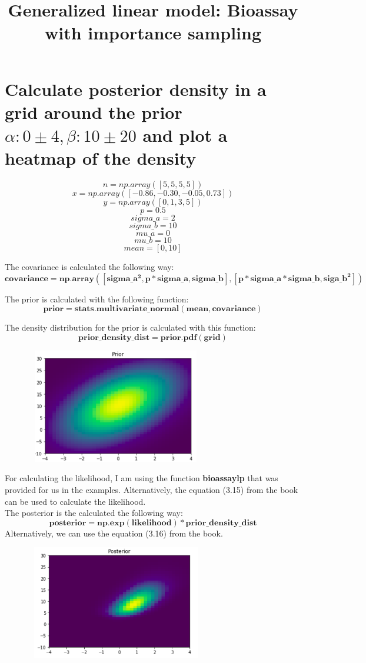 \documentclass[17pt]{article}
\begin{document}
\title{\textbf{Generalized linear model: Bioassay with importance sampling}}
\maketitle

\section{Calculate posterior density in a grid around the prior $ \alpha: 0 \pm 4, \beta: 10 \pm 20 $ and plot a heatmap of the density}

$$ n = np.array([5, 5, 5, 5]) $$
$$ x = np.array([-0.86, -0.30, -0.05, 0.73]) $$
$$ y = np.array([0, 1, 3, 5]) $$
$$ p = 0.5 $$
$$ sigma\_a = 2 $$
$$ sigma\_b = 10 $$
$$ mu\_a = 0 $$
$$ mu\_b = 10 $$
$$ mean = [0, 10] $$

The covariance is calculated the following way:
$$ \mathbf{covariance = np.array([sigma\_a^2, p * sigma\_a, sigma\_b], [p * sigma\_a * sigma\_b, siga\_b^2])} $$

The prior is calculated with the following function:
$$ \mathbf{prior = stats.multivariate\_normal(mean, covariance)} $$

The density distribution for the prior is calculated with this function:
$$ \mathbf{prior\_density\_dist = prior.pdf(grid)} $$

\begin{center}
\includegraphics[width=10cm, height=5cm]{prior.png}
\end{center} 

For calculating the likelihood, I am using the function \textbf{bioassaylp} that was provided for us in the examples. Alternatively, the equation (3.15) from the book can be used to calculate the likelihood. \\
The posterior is the calculated the following way:
$$ \mathbf{posterior = np.exp(likelihood) * prior\_density\_dist} $$
Alternatively, we can use the equation (3.16) from the book.
\begin{center}
\includegraphics[width=10cm, height=5cm]{posterior.png}
\end{center}
\end{document}
